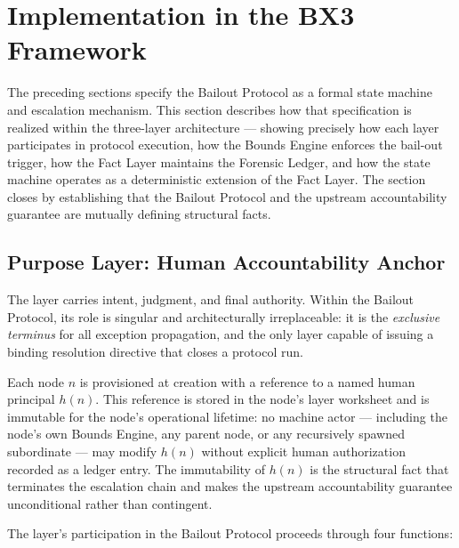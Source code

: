 \section{Implementation in the BX3 Framework}\label{sec:implementation}

The preceding sections specify the Bailout Protocol as a formal state machine and escalation mechanism. This section describes how that specification is realized within the \bxthree{} three-layer architecture — showing precisely how each layer participates in protocol execution, how the Bounds Engine enforces the bail-out trigger, how the Fact Layer maintains the Forensic Ledger, and how the state machine operates as a deterministic extension of the Fact Layer. The section closes by establishing that the Bailout Protocol and the upstream accountability guarantee are mutually defining structural facts.

\subsection{Purpose Layer: Human Accountability Anchor}\label{sec:purpose-layer}

The \purpose{} layer carries intent, judgment, and final authority. Within the Bailout Protocol, its role is singular and architecturally irreplaceable: it is the \emph{exclusive terminus} for all exception propagation, and the only layer capable of issuing a binding resolution directive that closes a protocol run.

Each \bxthree{} node $n$ is provisioned at creation with a reference to a named human principal $h(n)$. This reference is stored in the node's \purpose{} layer worksheet and is immutable for the node's operational lifetime: no machine actor — including the node's own Bounds Engine, any parent node, or any recursively spawned subordinate — may modify $h(n)$ without explicit human authorization recorded as a ledger entry. The immutability of $h(n)$ is the structural fact that terminates the escalation chain and makes the upstream accountability guarantee unconditional rather than contingent.

The \purpose{} layer's participation in the Bailout Protocol proceeds through four functions:


